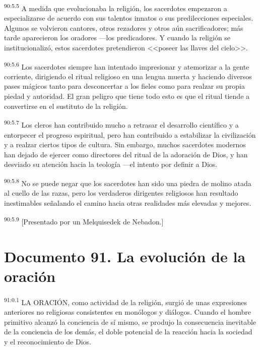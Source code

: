 \documentclass[twoside, 11pt]{book}
\begin{document}
\par
\textsuperscript{90:5.5} A medida que evolucionaba la religión, los sacerdotes empezaron a especializarse de acuerdo con sus talentos innatos o sus predilecciones especiales. Algunos se volvieron cantores, otros rezadores y otros aún sacrificadores; más tarde aparecieron los oradores ---los predicadores. Y cuando la religión se institucionalizó, estos sacerdotes pretendieron <<poseer las llaves del cielo>>.

\par
\textsuperscript{90:5.6} Los sacerdotes siempre han intentado impresionar y atemorizar a la gente corriente, dirigiendo el ritual religioso en una lengua muerta y haciendo diversos pases mágicos tanto para desconcertar a los fieles como para realzar su propia piedad y autoridad. El gran peligro que tiene todo esto es que el ritual tiende a convertirse en el sustituto de la religión.

\par
\textsuperscript{90:5.7} Los cleros han contribuido mucho a retrasar el desarrollo científico y a entorpecer el progreso espiritual, pero han contribuido a estabilizar la civilización y a realzar ciertos tipos de cultura. Sin embargo, muchos sacerdotes modernos han dejado de ejercer como directores del ritual de la adoración de Dios, y han desviado su atención hacia la teología ---el intento por definir a Dios.

\par
\textsuperscript{90:5.8} No se puede negar que los sacerdotes han sido una piedra de molino atada al cuello de las razas, pero los verdaderos dirigentes religiosos han resultado inestimables señalando el camino hacia otras realidades más elevadas y mejores.

\par
\textsuperscript{90:5.9} [Presentado por un Melquisedek de Nebadon.]


\chapter{Documento 91. La evolución de la oración}
\par
\textsuperscript{91:0.1} LA ORACIÓN, como actividad de la religión, surgió de unas expresiones anteriores no religiosas consistentes en monólogos y diálogos. Cuando el hombre primitivo alcanzó la conciencia de sí mismo, se produjo la consecuencia inevitable de la conciencia de los demás, el doble potencial de la reacción hacia la sociedad y el reconocimiento de Dios.
\end{document}
